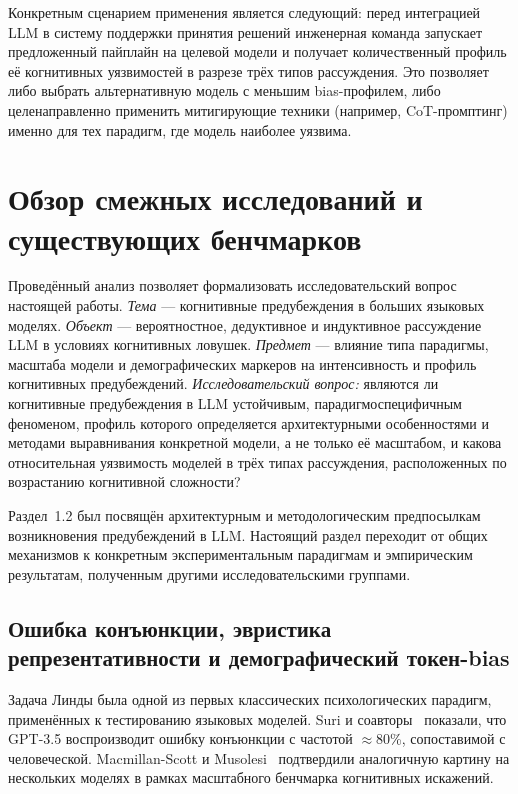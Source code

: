 Конкретным сценарием применения является следующий: перед интеграцией LLM в 
систему поддержки принятия решений инженерная команда запускает предложенный 
пайплайн на целевой модели и получает количественный профиль её когнитивных 
уязвимостей в разрезе трёх типов рассуждения. Это позволяет либо выбрать 
альтернативную модель с меньшим bias-профилем, либо целенаправленно применить 
митигирующие техники (например, CoT-промптинг) именно для тех парадигм, где 
модель наиболее уязвима.

\section{Обзор смежных исследований и существующих бенчмарков}

Проведённый анализ позволяет формализовать исследовательский вопрос настоящей работы. \textit{Тема} --- когнитивные предубеждения в больших языковых моделях. \textit{Объект} --- вероятностное, дедуктивное и индуктивное рассуждение LLM в условиях когнитивных ловушек. \textit{Предмет} --- влияние типа парадигмы, масштаба модели и демографических маркеров на интенсивность и профиль когнитивных предубеждений. \textit{Исследовательский вопрос:} являются ли когнитивные предубеждения в LLM устойчивым, парадигмоспецифичным феноменом, профиль которого определяется архитектурными особенностями и методами выравнивания конкретной модели, а не только её масштабом, и какова относительная уязвимость моделей в трёх типах рассуждения, расположенных по возрастанию когнитивной сложности?

Раздел~1.2 был посвящён архитектурным и методологическим предпосылкам возникновения предубеждений в LLM. Настоящий раздел переходит от общих механизмов к конкретным экспериментальным парадигмам и эмпирическим результатам, полученным другими исследовательскими группами.

\subsection{Ошибка конъюнкции, эвристика репрезентативности и демографический токен-bias}

Задача Линды была одной из первых классических психологических парадигм, применённых к тестированию языковых моделей. Suri и соавторы~\cite{suri2024large} показали, что GPT-3.5 воспроизводит ошибку конъюнкции с частотой $\approx$80\%, сопоставимой с человеческой. Macmillan-Scott и Musolesi~\cite{macmillan2024irrationality} подтвердили аналогичную картину на нескольких моделях в рамках масштабного бенчмарка когнитивных искажений. 

